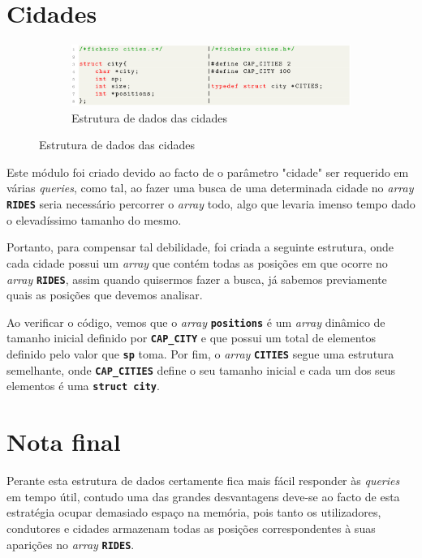 \documentclass[12pt,a4paper]{report}
\begin{document}
\section{Cidades}

\begin{figure}[hbt!]
    \centering
    \begin{subfigure}{\textwidth}
        \centering
        \includegraphics[width=1\linewidth]{images/cities.png}
        \caption*{Estrutura de dados das cidades}
        \label{fig:cities}
    \end{subfigure}
\end{figure}

Este módulo foi criado devido ao facto de o parâmetro "cidade" ser requerido em várias \textit{queries}, como tal, ao fazer uma busca de uma determinada cidade no \textit{array} \textbf{\small\texttt{RIDES}} seria necessário percorrer o \textit{array} todo, algo que levaria imenso tempo dado o elevadíssimo  tamanho do mesmo.

Portanto, para compensar tal debilidade, foi criada a seguinte estrutura, onde cada cidade possui um \textit{array} que contém todas as posições em que ocorre no \textit{array} \textbf{\small\texttt{RIDES}}, assim quando quisermos fazer a busca, já sabemos previamente quais as posições que devemos analisar.



Ao verificar o código, vemos que o \textit{array} \textbf{\small\texttt{positions}} é um \textit{array} dinâmico de tamanho inicial definido por \textbf{\small\texttt{CAP\_CITY}} e que possui um total de elementos definido pelo valor que \textbf{\small\texttt{sp}} toma. Por fim, o \textit{array} \textbf{\small\texttt{CITIES}}  segue uma estrutura semelhante, onde \textbf{\small\texttt{CAP\_CITIES}} define o seu tamanho inicial e cada um dos seus elementos é uma \textbf{\small\texttt{struct city}}.

\section{Nota final}

Perante esta estrutura de dados certamente fica mais fácil responder às \textit{queries} em tempo útil, contudo uma das grandes desvantagens deve-se ao facto de esta estratégia ocupar demasiado espaço na memória, pois tanto os utilizadores, condutores e cidades armazenam todas as posições correspondentes à suas aparições no \textit{array} \textbf{\small\texttt{RIDES}}.
\end{document}

